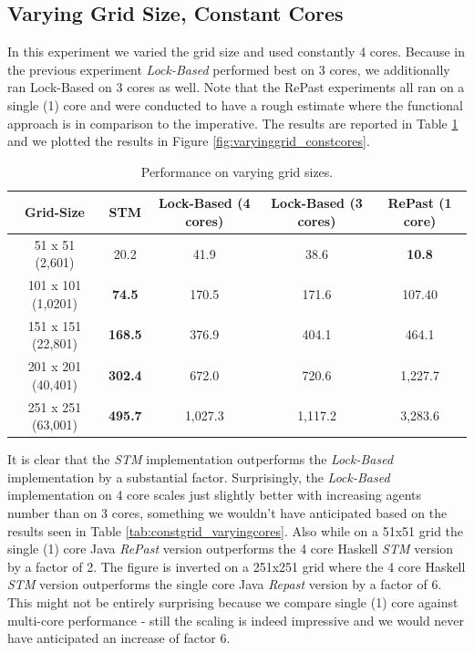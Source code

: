 \subsection{Varying Grid Size, Constant Cores}
In this experiment we varied the grid size and used constantly 4 cores. Because in the previous experiment \textit{Lock-Based} performed best on 3 cores, we additionally ran Lock-Based on 3 cores as well. Note that the RePast experiments all ran on a single (1) core and were conducted to have a rough estimate where the functional approach is in comparison to the imperative. The results are reported in Table \ref{tab:varyinggrid_constcores} and we plotted the results in Figure \ref{fig:varyinggrid_constcores}.

\begin{table}
	\centering
  	\begin{tabular}{ c || c | c | c | c }
        Grid-Size          & STM              & Lock-Based (4 cores) & Lock-Based (3 cores) & RePast (1 core) \\ \hline \hline 
   		51 x 51 (2,601)    & 20.2             & 41.9                 & 38.6                 & \textbf{10.8}   \\ \hline
   		101 x 101 (1,0201) & \textbf{74.5}    & 170.5                & 171.6                & 107.40          \\ \hline
   		151 x 151 (22,801) & \textbf{168.5}   & 376.9                & 404.1                & 464.1           \\ \hline
   		201 x 201 (40,401) & \textbf{302.4}   & 672.0                & 720.6                & 1,227.7         \\ \hline
   		251 x 251 (63,001) & \textbf{495.7}   & 1,027.3              & 1,117.2              & 3,283.6         \\ \hline \hline
  	\end{tabular}

  	\caption{Performance on varying grid sizes.}
	\label{tab:varyinggrid_constcores}
\end{table}

It is clear that the \textit{STM} implementation outperforms the \textit{Lock-Based} implementation by a substantial factor. Surprisingly, the \textit{Lock-Based} implementation on 4 core scales just slightly better with increasing agents number than on 3 cores, something we wouldn't have anticipated based on the results seen in Table \ref{tab:constgrid_varyingcores}. Also  while on a 51x51 grid the single (1) core Java \textit{RePast} version outperforms the 4 core Haskell \textit{STM} version by a factor of 2. The figure is inverted on a 251x251 grid where the 4 core Haskell \textit{STM} version outperforms the single core Java \textit{Repast} version by a factor of 6. This might not be entirely surprising because we compare single (1) core against multi-core performance - still the scaling is indeed impressive and we would never have anticipated an increase of factor 6. %

